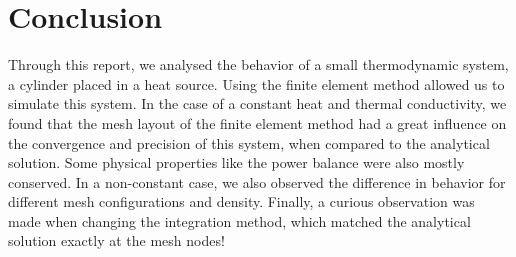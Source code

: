 \section{Conclusion}

Through this report, we analysed the behavior of a small thermodynamic system, a cylinder placed in a heat source. Using the finite element method allowed us to simulate this system. In the case of a constant heat and thermal conductivity, we found that the mesh layout of the finite element method had a great influence on the convergence and precision of this system, when compared to the analytical solution. Some physical properties like the power balance were also mostly conserved. In a non-constant case, we also observed the difference in behavior for different mesh configurations and density. Finally, a curious observation was made when changing the integration method, which matched the analytical solution exactly at the mesh nodes!
